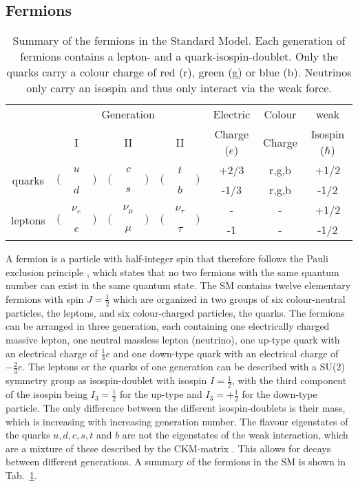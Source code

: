 \subsection{Fermions}
\begin{table}[b]
	\centering
	\caption[Summary of the fermions in the Standard Model.]{Summary of the fermions in the Standard Model. Each generation of fermions contains a lepton- and a quark-isospin-doublet. Only the quarks carry a colour charge of red (r), green (g) or blue (b). Neutrinos only carry an isospin and thus only interact via the weak force.}
	\label{tab:theo:fermions}
	\begin{tabular}{crclrclrclccc}
	\hline
	& \multicolumn{9}{c}{Generation} & Electric & Colour &  weak \\
	& \multicolumn{3}{c}{I} & \multicolumn{3}{c}{II} & \multicolumn{3}{c}{II} & Charge ($e$) & Charge &  Isospin ($\hbar$) \\
	\hline
	\multirow{2}{*}{quarks} & \multirow{2}{*}{$\Big($} & $u$ & \multirow{2}{*}{$\Big)$} & \multirow{2}{*}{$\Big($} & $c$ & \multirow{2}{*}{$\Big)$} & \multirow{2}{*}{$\Big($} & $t$ & \multirow{2}{*}{$\Big)$} & +2/3 & r,g,b & +1/2 \\  
	 & & $d$ & & & $s$ & & & $b$ & & -1/3 & r,g,b & -1/2 \\ 
	\multirow{2}{*}{leptons}& \multirow{2}{*}{$\Big($} & $\nu_e$ & \multirow{2}{*}{$\Big)$} & \multirow{2}{*}{$\Big($} & $\nu_\mu$ & \multirow{2}{*}{$\Big)$} & \multirow{2}{*}{$\Big($} & $\nu_\tau$ & \multirow{2}{*}{$\Big)$} & - & - & +1/2 \\ 
	 & & $e$ & & & $\mu$ & & & $\tau$ & & -1 & - & -1/2 \\
	\hline
	\end{tabular}
\end{table}
A fermion is a particle with half-integer spin that therefore follows the Pauli exclusion principle \cite{pauli}, which states that no two fermions with the same quantum number can exist in the same quantum state. The SM contains twelve elementary fermions with spin $J=\frac{1}{2}$ which are organized in two groups of six colour-neutral particles, the leptons, and six colour-charged particles, the quarks. The fermions can be arranged in three generation, each containing one electrically charged massive lepton, one neutral massless lepton (neutrino), one up-type quark with an electrical charge of $\frac{1}{3}e$ and one down-type quark with an electrical charge of $-\frac{2}{3}e$. The leptons or the quarks of one generation can be described with a SU(2) symmetry group as isospin-doublet with isospin $I=\frac{1}{2}$, with the third component of the isospin being $I_3=\frac{1}{2}$ for the up-type and $I_3=+\frac{1}{2}$ for the down-type particle. The only difference between the different isospin-doublets is their mass, which is increasing with increasing generation number. The flavour eigenstates of the quarks $u,d,c,s,t$ and $b$ are not the eigenstates of the weak interaction, which are a mixture of these described by the CKM-matrix \cite{CKM}. This allows for decays between different generations. 
A summary of the fermions in the SM is shown in Tab.~\ref{tab:theo:fermions}.\\



